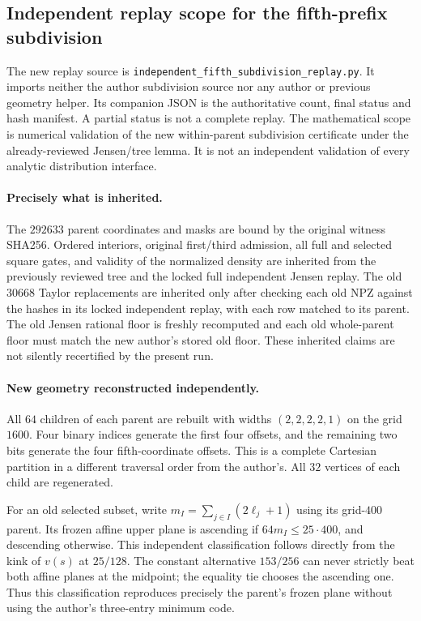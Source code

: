 \subsection{Independent replay scope for the fifth-prefix subdivision}
\label{sec:independent-fifth-subdivision-replay}

The new replay source is
\texttt{independent\_fifth\_subdivision\_replay.py}. It imports neither
the author subdivision source nor any author or previous geometry helper.
Its companion JSON is the authoritative count, final status and hash
manifest. A partial status is not a complete replay. The mathematical
scope is numerical validation of the new within-parent subdivision
certificate under the already-reviewed Jensen/tree lemma. It is not an
independent validation of every analytic distribution interface.

\paragraph{Precisely what is inherited.}
The $292633$ parent coordinates and masks are bound by the original
witness SHA256. Ordered interiors, original first/third admission, all
full and selected square gates, and validity of the normalized density
are inherited from the previously reviewed tree and the locked full
independent Jensen replay. The old $30668$ Taylor replacements are
inherited only after checking each old NPZ against the hashes in its
locked independent replay, with each row matched to its parent.
The old Jensen rational floor is freshly recomputed and each old
whole-parent floor must match the new author's stored old floor.
These inherited claims are not silently recertified by the present run.

\paragraph{New geometry reconstructed independently.}
All $64$ children of each parent are rebuilt with widths $(2,2,2,2,1)$
on the grid $1600$. Four binary indices generate the first four offsets,
and the remaining two bits generate the four fifth-coordinate offsets.
This is a complete Cartesian partition in a different traversal order
from the author's. All $32$ vertices of each child are regenerated.

For an old selected subset, write $m_I=\sum_{j\in I}(2\ell_j+1)$
using its grid-$400$ parent. Its frozen affine upper plane is ascending
if $64m_I\le25\cdot400$, and descending otherwise. This independent
classification follows directly from the kink of $v(s)$ at $25/128$.
The constant alternative $153/256$ can never strictly beat both affine
planes at the midpoint; the equality tie chooses the ascending one.
Thus this classification reproduces precisely the parent's frozen
plane without using the author's three-entry minimum code.

